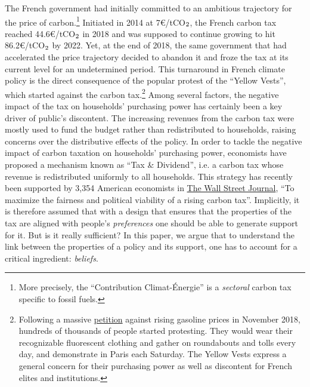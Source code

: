 \documentclass[11pt]{article}
\begin{document}
The French government had initially committed to an ambitious trajectory for the price of carbon.\footnote{More precisely, the ``Contribution Climat-Énergie'' is a \textit{sectoral} carbon tax specific to fossil fuels.} Initiated in 2014 at 7\euro/tCO$_\textnormal{2}$, the French carbon tax reached 44.6\euro/tCO$_\textnormal{2}$ in 2018 and was supposed to continue growing to hit 86.2\euro/tCO$_\textnormal{2}$ by 2022. Yet, at the end of 2018, the same government that had accelerated the price trajectory decided to abandon it and froze the tax at its current level for an undetermined period. This turnaround in French climate policy is the direct consequence of the popular protest of the ``Yellow Vests'', which started against the carbon tax.\footnote{Following a massive \href{https://www.change.org/p/pour-une-baisse-des-prix-\%C3\%A0-la-pompe-essence-diesel}{petition} against rising gasoline prices in November 2018, hundreds of thousands of people started protesting. They would wear their recognizable fluorescent clothing and gather on roundabouts and tolls every day, and demonstrate in Paris each Saturday. The Yellow Vests express a general concern for their purchasing power as well as discontent for French elites and institutions.} Among several factors, the negative impact of the tax on households' purchasing power has certainly been a key driver of public's discontent. The increasing revenues from the carbon tax were mostly used to fund the budget rather than redistributed to households, raising concerns over the distributive effects of the policy. In order to tackle the negative impact of carbon taxation on households' purchasing power, economists have proposed a mechanism known as ``Tax \& Dividend'', i.e. a carbon tax whose revenue is redistributed uniformly to all households. This strategy has recently been supported by 3,354 American economists in \href{https://www.clcouncil.org/media/EconomistsStatement.pdf}{The Wall Street Journal}, ``To maximize the fairness and political viability of a rising carbon tax''. Implicitly, it is therefore assumed that with a design that ensures that the properties of the tax are aligned with people's \textit{preferences} one should be able to generate support for it. But is it really sufficient? In this paper, we argue that to understand the link between the properties of a policy and its support, one has to account for a critical ingredient: \textit{beliefs}.
\end{document}
